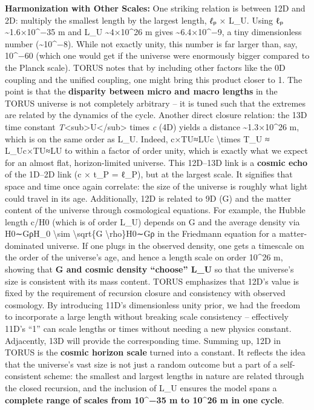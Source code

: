 \textbf{Harmonization with Other Scales:} One striking relation is
between 12D and 2D: multiply the smallest length by the largest length,
\emph{ℓ}ₚ × L\_U. Using ℓₚ \textasciitilde{}1.6×10\^{}−35 m and L\_U
\textasciitilde{}4×10\^{}26 m gives \textasciitilde{}6.4×10\^{}−9, a
tiny dimensionless number (\textasciitilde{}10\^{}−8)​. While not
exactly unity, this number is far larger than, say, 10\^{}−60 (which one
would get if the universe were enormously bigger compared to the Planck
scale). TORUS notes that by including other factors like the 0D coupling
and the unified coupling, one might bring this product closer to 1​. The
point is that the \textbf{disparity between micro and macro lengths} in
the TORUS universe is not completely arbitrary -- it is tuned such that
the extremes are related by the dynamics of the cycle​. Another direct
closure relation: the 13D time constant
\emph{T}\textless{}sub\textgreater{}U\textless{}/sub\textgreater{} times
\emph{c} (4D) yields a distance \textasciitilde{}1.3×10\^{}26 m, which
is on the same order as L\_U​. Indeed, c×TU≈LUc \textbackslash{}times
T\_U ≈ L\_Uc×TU​≈LU​ to within a factor of order unity, which is exactly
what we expect for an almost flat, horizon-limited universe. This
12D--13D link is a \textbf{cosmic echo} of the 1D--2D link (c × t\_P =
ℓ\_P), but at the largest scale​. It signifies that space and time once
again correlate: the size of the universe is roughly what light could
travel in its age. Additionally, 12D is related to 9D (G) and the matter
content of the universe through cosmological equations. For example, the
Hubble length c/H0 (which is of order L\_U) depends on G and the average
density via H0∼GρH\_0 \textbackslash{}sim \textbackslash{}sqrt\{G
\textbackslash{}rho\}H0​∼Gρ​ in the Friedmann equation for a
matter-dominated universe​. If one plugs in the observed density, one
gets a timescale on the order of the universe's age, and hence a length
scale on order 10\^{}26 m, showing that \textbf{G and cosmic density
``choose'' L\_U} so that the universe's size is consistent with its mass
content. TORUS emphasizes that 12D's value is fixed by the requirement
of recursion closure and consistency with observed cosmology​. By
introducing 11D's dimensionless unity prior, we had the freedom to
incorporate a large length without breaking scale consistency --
effectively 11D's ``1'' can scale lengths or times without needing a new
physics constant​. Adjacently, 13D will provide the corresponding time.
Summing up, 12D in TORUS is the \textbf{cosmic horizon scale} turned
into a constant. It reflects the idea that the universe's vast size is
not just a random outcome but a part of a self-consistent scheme: the
smallest and largest lengths in nature are related through the closed
recursion, and the inclusion of L\_U ensures the model spans a
\textbf{complete range of scales from 10\^{}−35 m to 10\^{}26 m in one
cycle}.

